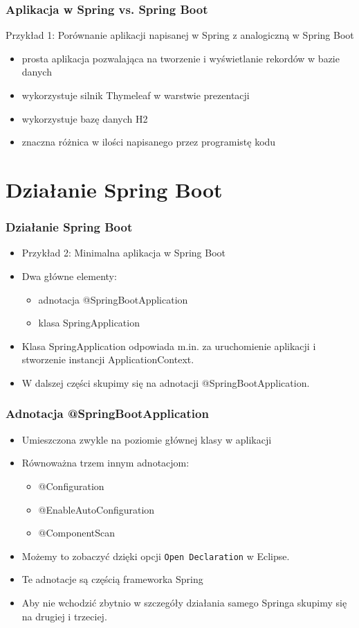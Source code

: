 \documentclass{beamer}
\begin{document}
\begin{frame}
\frametitle{Aplikacja w Spring vs. Spring Boot}
Przykład 1: Porównanie aplikacji napisanej w Spring z analogiczną w Spring Boot 
\begin{itemize}
\item prosta aplikacja pozwalająca na tworzenie i wyświetlanie rekordów w bazie danych
\item wykorzystuje silnik Thymeleaf w warstwie prezentacji
\item wykorzystuje bazę danych H2
\item znaczna różnica w ilości napisanego przez programistę kodu
\end{itemize}
\end{frame}

\section{Działanie Spring Boot}


\begin{frame}
\frametitle{Działanie Spring Boot}
\begin{itemize}
\item Przykład 2: Minimalna aplikacja w Spring Boot
\item Dwa główne elementy:
\begin{itemize}
    \item adnotacja @SpringBootApplication
    \item klasa SpringApplication
\end{itemize}
\item Klasa SpringApplication odpowiada m.in. za uruchomienie aplikacji i stworzenie instancji ApplicationContext.
\item W dalszej części skupimy się na adnotacji @SpringBootApplication.
\end{itemize}
\end{frame}


\begin{frame}
\frametitle{Adnotacja @SpringBootApplication}
\begin{itemize}
\item Umieszczona zwykle na poziomie głównej klasy w aplikacji 
\item Równoważna trzem innym adnotacjom:
\begin{itemize}
    \item @Configuration
    \item @EnableAutoConfiguration
    \item @ComponentScan
\end{itemize}
\item Możemy to zobaczyć dzięki opcji \lstinline{Open Declaration} w Eclipse.
\item Te adnotacje są częścią frameworka Spring
\item Aby nie wchodzić zbytnio w szczegóły działania samego Springa skupimy się na drugiej i trzeciej.
\end{itemize}
\end{frame}
\end{document}

